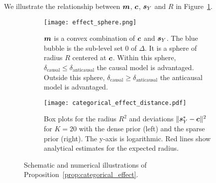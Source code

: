 \begin{subappendices}
We illustrate the relationship between ${\bm{m}}$, ${\bm{c}}$, ${\bm{s}}_Y$  and $R$ in Figure~\ref{fig:categorical_sketch_effect}. 

\begin{figure}
    \centering
    \begin{subfigure}{0.45\textwidth}
    \centering
    \texttt{[image: effect\_sphere.png]}
    \caption{
    ${\bm{m}}$ is a convex combination of ${\bm{c}}$ and ${\bm{s}}_Y$. 
    The blue bubble is the sub-level set 0 of $\Delta$.
    It is a sphere of radius $R$ centered at ${\bm{c}}$.
    Within this sphere, $\delta_\text{causal} \leq \delta_\text{anticausal}$  the causal model is advantaged. 
    Outside this sphere, $\delta_\text{causal} \geq \delta_\text{anticausal}$ the anticausal model is advantaged.}
    \label{fig:categorical_sketch_effect}
    \end{subfigure}
    \quad \quad
    \begin{subfigure}{0.45\textwidth}
    \centering
    \texttt{[image: categorical\_effect\_distance.pdf]}
    \caption{
    Box plots for the radius $R^2$ and deviations $\|{\bm{s}}_Y^* - {\bm{c}}\|^2$ for $K=20$ with the dense prior (left) and the sparse prior (right). 
    The y-axis is logarithmic.
    Red lines show analytical estimates for the expected radius.
    }
    \label{fig:radius_boxplot}
    \end{subfigure}
    \caption{Schematic and numerical illustrations of Proposition~\ref{prop:categorical_effect}. 
    }
    \label{fig:radius_illustrations}
\end{figure}


\end{subappendices}
